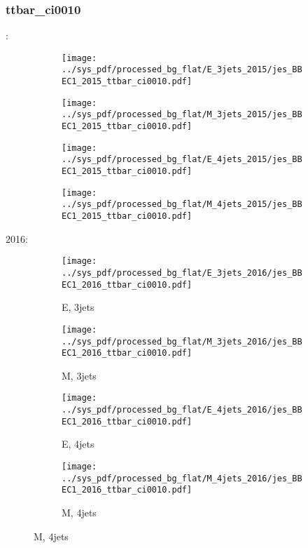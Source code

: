 \documentclass{beamer}
\begin{document}
\begin{frame}
\frametitle{ttbar_ci0010}
\fontsize{5}{1}:
\begin{figure}
\centering
\begin{subfigure}[b]{0.24\textwidth}
\texttt{[image: ../sys\_pdf/processed\_bg\_flat/E\_3jets\_2015/jes\_BBEC1\_2015\_ttbar\_ci0010.pdf]}
\end{subfigure}
\begin{subfigure}[b]{0.24\textwidth}
\texttt{[image: ../sys\_pdf/processed\_bg\_flat/M\_3jets\_2015/jes\_BBEC1\_2015\_ttbar\_ci0010.pdf]}
\end{subfigure}
\begin{subfigure}[b]{0.24\textwidth}
\texttt{[image: ../sys\_pdf/processed\_bg\_flat/E\_4jets\_2015/jes\_BBEC1\_2015\_ttbar\_ci0010.pdf]}
\end{subfigure}
\begin{subfigure}[b]{0.24\textwidth}
\texttt{[image: ../sys\_pdf/processed\_bg\_flat/M\_4jets\_2015/jes\_BBEC1\_2015\_ttbar\_ci0010.pdf]}
\end{subfigure}
\end{figure}
2016:
\begin{figure}
\centering
\begin{subfigure}[b]{0.24\textwidth}
\texttt{[image: ../sys\_pdf/processed\_bg\_flat/E\_3jets\_2016/jes\_BBEC1\_2016\_ttbar\_ci0010.pdf]}
\captionsetup{font=tiny}
\caption{E, 3jets}
\end{subfigure}
\begin{subfigure}[b]{0.24\textwidth}
\texttt{[image: ../sys\_pdf/processed\_bg\_flat/M\_3jets\_2016/jes\_BBEC1\_2016\_ttbar\_ci0010.pdf]}
\captionsetup{font=tiny}
\caption{M, 3jets}
\end{subfigure}
\begin{subfigure}[b]{0.24\textwidth}
\texttt{[image: ../sys\_pdf/processed\_bg\_flat/E\_4jets\_2016/jes\_BBEC1\_2016\_ttbar\_ci0010.pdf]}
\captionsetup{font=tiny}
\caption{E, 4jets}
\end{subfigure}
\begin{subfigure}[b]{0.24\textwidth}
\texttt{[image: ../sys\_pdf/processed\_bg\_flat/M\_4jets\_2016/jes\_BBEC1\_2016\_ttbar\_ci0010.pdf]}
\captionsetup{font=tiny}
\caption{M, 4jets}
\end{subfigure}
\end{figure}
\end{frame}
\end{document}
